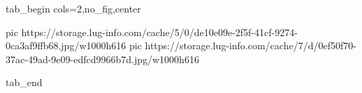  
 
 
 
 


\ifcmt
  tab_begin cols=2,no_fig,center

     pic https://storage.lug-info.com/cache/5/0/de10e09e-2f5f-41cf-9274-0ca3af9ffb68.jpg/w1000h616%
		 pic https://storage.lug-info.com/cache/7/d/0ef50f70-37ac-49ad-9e09-edfcd9966b7d.jpg/w1000h616%

  tab_end
\fi
